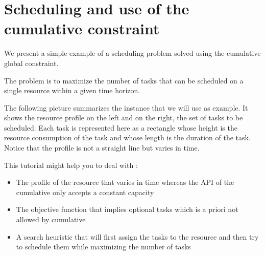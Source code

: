 
\section{Scheduling and use of the cumulative constraint}\label{schedulinganduseofthecumulative:schedulinganduseofthecumulativeconstraint}\hypertarget{schedulinganduseofthecumulative:schedulinganduseofthecumulativeconstraint}{}


We present a simple example of a scheduling problem solved using the cumulative global constraint.

The problem is to maximize the number of tasks that can be scheduled on  a single resource within a given time horizon.

The following picture summarizes the instance that we will use as example. 
It shows the resource profile on the left and on the right, the set of tasks to be scheduled. Each task is represented here as a rectangle whose height is the resource consumption of the task and whose length is the duration of the task. Notice that the profile is not a straight line but varies in time. 


This tutorial might help you to deal with :

\begin{itemize}
	\item The profile of the resource that varies in time whereas the API of the cumulative only accepts a constant capacity
	\item The objective function that implies optional tasks which is a priori not allowed by cumulative
	\item A search heuristic that will first assign the tasks to the resource and then try to schedule them while maximizing the number of tasks
\end{itemize}

